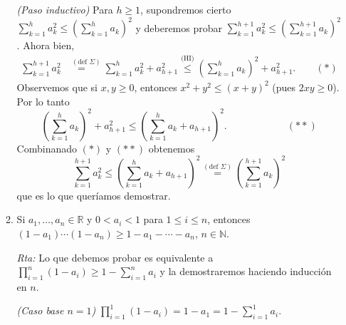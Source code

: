 \documentclass[a4paper,12pt,twoside,spanish,reqno]{amsbook}
\numberwithin{equation}{section}
\newcommand{\rta}{\noindent\textit{Rta: }}
\begin{document}
\begin{enumerate}[resume]
\begin{enumerate}
                \textit{(Paso inductivo) }  Para  $h \ge 1$,  supondremos cierto $\sum_{k=1}^h a_{k}^{2}\leq \left(\sum_{k=1}^h a_{k}\right)^{2}$ y deberemos  probar $\sum_{k=1}^{h+1} a_{k}^{2}\leq \left(\sum_{k=1}^{h+1} a_{k}\right)^{2}$.  Ahora bien,
                \begin{align*}
                \sum_{k=1}^{h+1} a_{k}^{2} &\overset{(\text{def } \Sigma)}{=\quad} \sum_{k=1}^h a_{k}^{2} + a_{h+1}^{2} \overset{\text{(HI)}}{\leq} \left(\sum_{k=1}^h a_{k}\right)^{2} + a_{h+1}^{2}. \qquad (*)
                \end{align*}
                Observemos que si $x,y \ge 0$,  entonces $x^2 + y^2 \leq (x+y)^2$ (pues $2xy \ge 0$). Por lo tanto 
                \begin{equation*}
                     \left(\sum_{k=1}^h a_{k}\right)^{2} + a_{h+1}^{2} \leq  \left(\sum_{k=1}^h a_{k}+a_{h+1}\right)^{2}. \qquad\qquad\qquad (**)
                \end{equation*}
                Combinanado $(*)$ y $(**)$ obtenemos
                \begin{equation*}
                    \sum_{k=1}^{h+1} a_{k}^{2} \leq \left(\sum_{k=1}^h a_{k}+a_{h+1}\right)^{2} \overset{(\text{def } \Sigma)}{=} \left(\sum_{k=1}^{h+1} a_{k}\right)^{2}
                \end{equation*}
                que es lo que queríamos demostrar. 
                
                \item Si $a_1,\dots,a_n \in \mathbb R$ y $0<a_i<1$ para $1 \le i\le n$, entonces $(1-a_1)\cdots(1-a_n)\ge 1-a_1-\cdots -a_n$, $n\in \mathbb N$.
                
                \rta Lo que debemos probar es equivalente a $\prod_{i=1}^{n} (1-a_i) \ge 1 - \sum_{i=1}^{n} a_i$ y la demostraremos haciendo inducción en $n$.  
                
                \textit{(Caso base $n=1$) } $\prod_{i=1}^{1} (1-a_i) = 1-a_1 = 1 - \sum_{i=1}^{1} a_i$.
                

\end{enumerate}
\end{enumerate}
\end{document}
